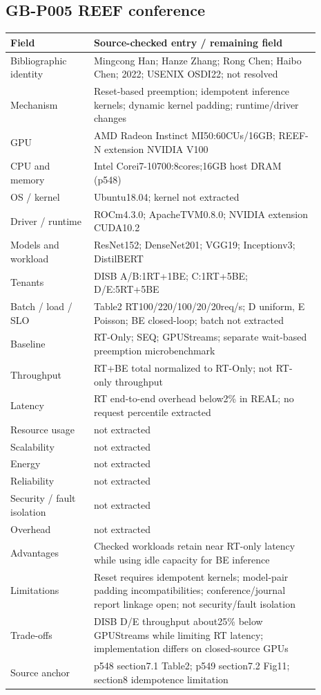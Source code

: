 \documentclass[12pt,a4paper]{article}
\begin{document}
\subsection{GB-P005 REEF conference}
\begin{longtable}{p{0.24\linewidth}p{0.65\linewidth}}
\toprule
Field & Source-checked entry /\allowbreak{} remaining field\\\midrule
\endhead
Bibliographic identity & Mingcong Han; Hanze Zhang; Rong Chen; Haibo Chen; 2022; USENIX OSDI22; not resolved\\
Mechanism & Reset-based preemption; idempotent inference kernels; dynamic kernel padding; runtime/\allowbreak{}driver changes\\
GPU & AMD Radeon Instinct MI50:60CUs/\allowbreak{}16GB; REEF-N extension NVIDIA V100\\
CPU and memory & Intel Corei7-10700:8cores;16GB host DRAM (p548)\\
OS /\allowbreak{} kernel & Ubuntu18.04; kernel not extracted\\
Driver /\allowbreak{} runtime & ROCm4.3.0; ApacheTVM0.8.0; NVIDIA extension CUDA10.2\\
Models and workload & ResNet152; DenseNet201; VGG19; Inceptionv3; DistilBERT\\
Tenants & DISB A/\allowbreak{}B:1RT+1BE; C:1RT+5BE; D/\allowbreak{}E:5RT+5BE\\
Batch /\allowbreak{} load /\allowbreak{} SLO & Table2 RT100/\allowbreak{}220/\allowbreak{}100/\allowbreak{}20/\allowbreak{}20req/\allowbreak{}s; D uniform, E Poisson; BE closed-loop; batch not extracted\\
Baseline & RT-Only; SEQ; GPUStreams; separate wait-based preemption microbenchmark\\
Throughput & RT+BE total normalized to RT-Only; not RT-only throughput\\
Latency & RT end-to-end overhead below2\% in REAL; no request percentile extracted\\
Resource usage & not extracted\\
Scalability & not extracted\\
Energy & not extracted\\
Reliability & not extracted\\
Security /\allowbreak{} fault isolation & not extracted\\
Overhead & not extracted\\
Advantages & Checked workloads retain near RT-only latency while using idle capacity for BE inference\\
Limitations & Reset requires idempotent kernels; model-pair padding incompatibilities; conference/\allowbreak{}journal report linkage open; not security/\allowbreak{}fault isolation\\
Trade-offs & DISB D/\allowbreak{}E throughput about25\% below GPUStreams while limiting RT latency; implementation differs on closed-source GPUs\\
Source anchor & p548 section7.1 Table2; p549 section7.2 Fig11; section8 idempotence limitation\\
\bottomrule
\end{longtable}
\end{document}
